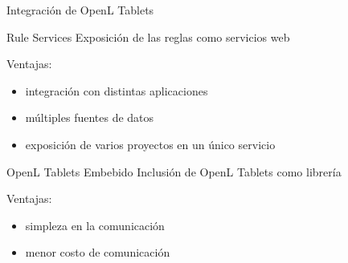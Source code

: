 \documentclass[10pt]{beamer}
\begin{document}
\begin{frame}{Integración de OpenL Tablets}
    \begin{block}{Rule Services}
        Exposición de las reglas como servicios web

        Ventajas:
        \begin{itemize}
            \item integración con distintas aplicaciones
            \item múltiples fuentes de datos
            \item exposición de varios proyectos en un único servicio
        \end{itemize}
    \end{block}
    \begin{block}{OpenL Tablets Embebido}
        Inclusión de OpenL Tablets como librería

        Ventajas:
        \begin{itemize}
            \item simpleza en la comunicación
            \item menor costo de comunicación
        \end{itemize}
    \end{block}
\end{frame}

\end{document}
